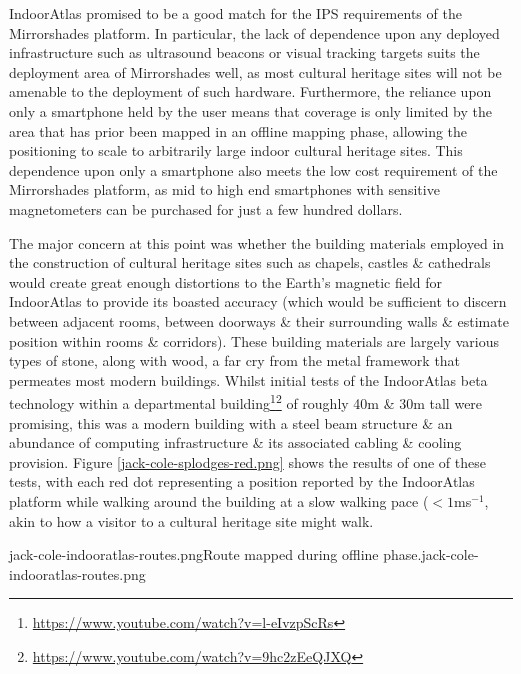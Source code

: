 IndoorAtlas promised to be a good match for the IPS requirements of the Mirrorshades platform. In particular, the lack of dependence upon any deployed infrastructure such as ultrasound beacons or visual tracking targets suits the deployment area of Mirrorshades well, as most cultural heritage sites will not be amenable to the deployment of such hardware. Furthermore, the reliance upon only a smartphone held by the user means that coverage is only limited by the area that has prior been mapped in an offline mapping phase, allowing the positioning to scale to arbitrarily large indoor cultural heritage sites. This dependence upon only a smartphone also meets the low cost requirement of the Mirrorshades platform, as mid to high end smartphones with sensitive magnetometers can be purchased for just a few hundred dollars.

The major concern at this point was whether the building materials employed in the construction of cultural heritage sites such as chapels, castles \& cathedrals would create great enough distortions to the Earth's magnetic field for IndoorAtlas to provide its boasted accuracy (which would be sufficient to discern between adjacent rooms, between doorways \& their surrounding walls \& estimate position within rooms \& corridors). These building materials are largely various types of stone, along with wood, a far cry from the metal framework that permeates most modern buildings. Whilst initial tests of the IndoorAtlas beta technology within a departmental building\footnote{\url{https://www.youtube.com/watch?v=l-eIvzpScRs}}\footnote{\url{https://www.youtube.com/watch?v=9hc2zEeQJXQ}} of roughly 40m \& 30m tall were promising, this was a modern building with a steel beam structure \& an abundance of computing infrastructure \& its associated cabling \& cooling provision. Figure \ref{jack-cole-splodges-red.png} shows the results of one of these tests, with each red dot representing a position reported by the IndoorAtlas platform while walking around the building at a slow walking pace ($<1$ms$^{-1}$, akin to how a visitor to a cultural heritage site might walk.

       {jack-cole-indooratlas-routes.png}{Route mapped during offline phase.}{jack-cole-indooratlas-routes.png}

